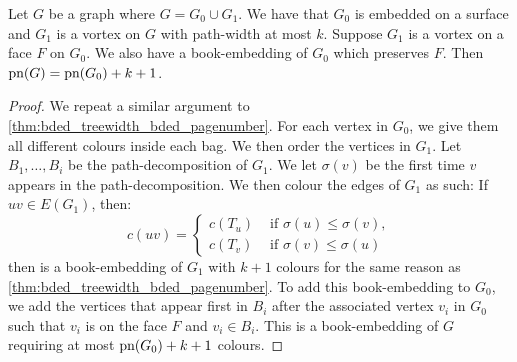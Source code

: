 \begin{lemma}\label{lem:preserved_faces_pagenumber}
	Let \(G\) be a graph where \(G = G_0 \cup G_1\). We have that \(G_0\) is embedded on a surface and \(G_1\) is a vortex on \(G\) with path-width at most \(k\). Suppose \(G_1\) is a vortex on a face \(F\) on \(G_0\). We also have a book-embedding of \(G_0\) which preserves \(F\). Then \(\text{pn}(G) = \text{pn}(G_0) + k + 1\). 
\end{lemma}

\begin{proof}
	We repeat a similar argument to \cref{thm:bded_treewidth_bded_pagenumber}. For each vertex in \(G_0\), we give them all different colours inside each bag. We then order the vertices in \(G_1\). Let \(B_1, \ldots, B_i\) be the path-decomposition of \(G_1\). We let \(\sigma(v)\) be the first time \(v\) appears in the path-decomposition. We then colour the edges of \(G_1\) as such: If \(uv \in E(G_1)\), then:
	\begin{equation}
		c(uv) = 
		\begin{cases}
			c(T_u) &\text{ if } \sigma(u) \leq \sigma(v),\\
			c(T_v) &\text{ if } \sigma(v) \leq \sigma(u)
		\end{cases}
	\end{equation}
	then is a book-embedding of \(G_1\) with \(k+1\) colours for the same reason as \cref{thm:bded_treewidth_bded_pagenumber}.
	To add this book-embedding to \(G_0\), we add the vertices that appear first in \(B_i\) after the associated vertex \(v_i\) in \(G_0\) such that \(v_i\) is on the face \(F\) and \(v_i \in B_i\). This is a book-embedding of \(G\) requiring at most \(\text{pn}(G_0) + k + 1\) colours. 
\end{proof}

